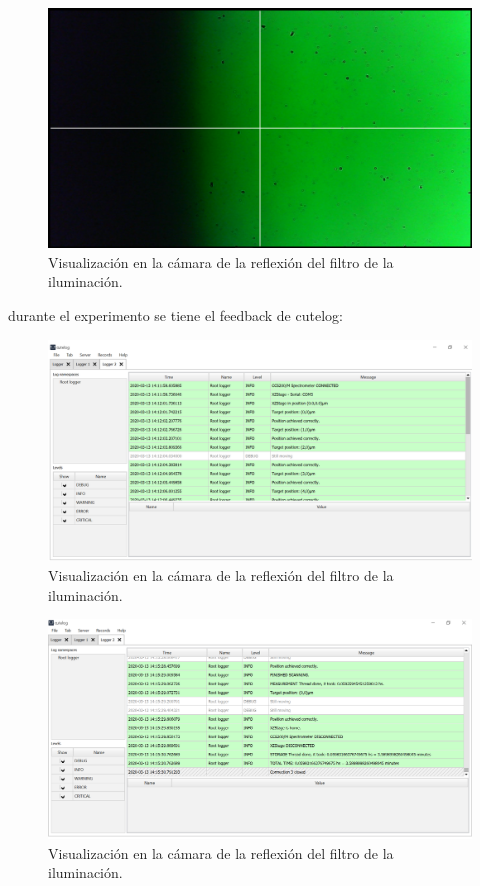 \begin{figure}[H]
	\centering
	\includegraphics[scale=0.5]{Figs/microespectrometro/medtransicion.png}
	\caption{Visualización en la cámara de la reflexión del filtro de la iluminación.}
	\label{fig:bgcel}
\end{figure}


durante el experimento se tiene el feedback de cutelog:

\begin{figure}[H]
	\centering
	\includegraphics[scale=0.5]{Figs/microespectrometro/cutelog.png}
	\caption{Visualización en la cámara de la reflexión del filtro de la iluminación.}
	\label{fig:bgcel}
\end{figure}


\begin{figure}[H]
	\centering
	\includegraphics[scale=0.5]{Figs/microespectrometro/fincutelog.png}
	\caption{Visualización en la cámara de la reflexión del filtro de la iluminación.}
	\label{fig:bgcel}
\end{figure}


